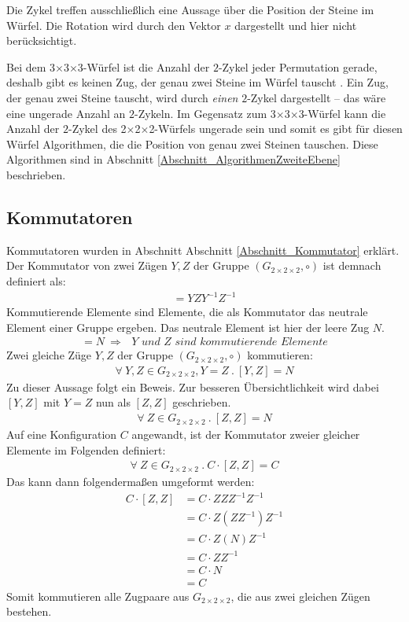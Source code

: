 \documentclass[12pt,a4paper, usenames, dvipsnames]{article}
\theoremstyle{mystyle}
\theoremstyle{definition}
\newcommand{\Gtwo}{\ensuremath{G_{2\times 2\times 2}}}
\newcommand{\Ttwo}{2$\times$2$\times$2-}
\newcommand{\Tthree}{3$\times$3$\times$3-}
\begin{document}
Die Zykel treffen ausschließlich eine Aussage über die Position der Steine im Würfel. Die Rotation wird durch den Vektor $x$ dargestellt und hier nicht berücksichtigt. 

Bei dem \Tthree Würfel ist die Anzahl der $2$-Zykel jeder Permutation gerade, deshalb gibt es keinen Zug, der genau zwei Steine im Würfel tauscht \cite{TD}. Ein Zug, der genau zwei Steine tauscht, wird durch \textit{einen} $2$-Zykel dargestellt -- das wäre eine ungerade Anzahl an $2$-Zykeln. Im Gegensatz zum \Tthree Würfel kann die Anzahl der $2$-Zykel des \Ttwo Würfels ungerade sein und somit es gibt für diesen Würfel Algorithmen, die die Position von genau zwei Steinen tauschen. Diese Algorithmen sind in Abschnitt \ref{Abschnitt_AlgorithmenZweiteEbene} beschrieben. 

%
%
%
%
%
%
%
%
%
%
%
%
%
%
%
%
%
%
%
%
\subsection{Kommutatoren}
\label{Abschnitt_Kommutatoren8}

Kommutatoren wurden in Abschnitt Abschnitt \ref{Abschnitt_Kommutator} erklärt. Der Kommutator von zwei Zügen $Y, Z$ der Gruppe $(\Gtwo, \circ)$ ist demnach definiert als:
\begin{align*}
[Y,Z]=YZY^{-1}Z^{-1}
\end{align*}
Kommutierende Elemente sind Elemente, die als Kommutator das neutrale Element einer Gruppe ergeben. Das neutrale Element ist hier der leere Zug $N$.
\begin{align*}
[Y,Z]= N\ \Rightarrow \textit{ $Y$ und $Z$ sind kommutierende Elemente}
\end{align*}
Zwei gleiche Züge $Y, Z$ der Gruppe $(\Gtwo, \circ)$ kommutieren:
\begin{align*}
\forall \ Y, Z \in \Gtwo, Y = Z \ . \ [Y, Z] = N
\end{align*}
Zu dieser Aussage folgt ein Beweis. Zur besseren Übersichtlichkeit wird dabei $[Y,Z]$ mit $Y=Z$ nun als $[Z,Z]$ geschrieben.
\begin{align*}
\forall \ Z \in \Gtwo\ . \ [Z, Z] = N
\end{align*}
Auf eine Konfiguration $C$ angewandt, ist der Kommutator zweier gleicher Elemente im Folgenden definiert:
\begin{align*}
\forall \ Z \in \Gtwo\ . \ C \cdot [Z, Z] = C
\end{align*}
Das kann dann folgendermaßen umgeformt werden:
\begin{align*}
C \cdot [Z, Z] & = C \cdot ZZZ^{-1}Z^{-1} \\
& = C \cdot Z(ZZ^{-1})Z^{-1} \\
& = C \cdot Z(N)Z^{-1} \\
& = C \cdot ZZ^{-1} \\
& = C \cdot N \\
& = C
\end{align*}
Somit kommutieren alle Zugpaare aus $\Gtwo$, die aus zwei gleichen Zügen bestehen.
\end{document}
